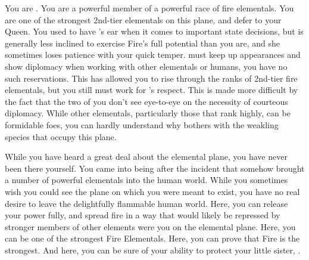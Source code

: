 \documentclass[char]{elementals}
\begin{document}
\name{\cPyro{}}

You are \cPyro{\intro}.  You are a powerful member of a powerful race of fire elementals.  You are one of the strongest 2nd-tier elementals on this plane, and defer to your Queen.  You used to have \cQueen{\intro}'s ear when it comes to important state decisions, but \cQueen{\they} is generally less inclined to exercise Fire's full potential than you are, and she sometimes loses patience with your quick temper.  \cQueen{\they} must keep up appearances and show diplomacy when working with other elementals or humans, you have no such reservations.  This has allowed you to rise through the ranks of 2nd-tier fire elementals, but you still must work for \cQueen{}'s respect.  This is made more difficult by the fact that the two of you don't see eye-to-eye on the necessity of courteous diplomacy.  While other elementals, particularly those that rank highly, can be formidable foes, you can hardly understand why \cQueen{} bothers with the weakling species that occupy this plane.

While you have heard a great deal about the elemental plane, you have never been there yourself.  You came into being after the incident that somehow brought a number of powerful elementals into the human world.  While you sometimes wish you could see the plane on which you were meant to exist, you have no real desire to leave the delightfully flammable human world.  Here, you can release your power fully, and spread fire in a way that would likely be repressed by stronger members of other elements were you on the elemental plane.  Here, you can be one of the strongest Fire Elementals.  Here, you can prove that Fire is the strongest.  And here, you can be sure of your ability to protect your little sister, \cJuliet{\intro}.
\end{document}
